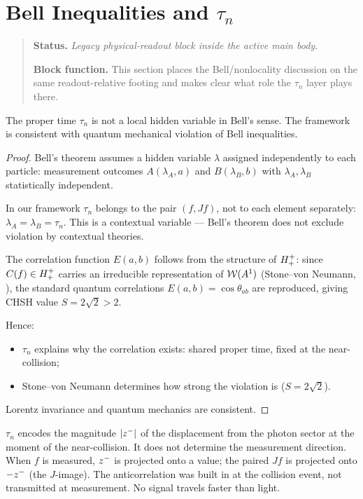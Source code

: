 \section[Bell Inequalities and tau-n]{Bell Inequalities and \texorpdfstring{$\tau_n$}{tau_n}}
\begin{quote}\small
\noindent\textbf{Status.} \emph{Legacy physical-readout block inside the active main body.}\par
\noindent\textbf{Block function.} This section places the Bell/nonlocality discussion on the same readout-relative footing and makes clear what role the $\tau_n$ layer plays there.
\end{quote}
\label{sec:bell}

\begin{theorem}
\label{thm:bell-consistency}
The proper time $\tau_n$ is not a local hidden variable in Bell's sense.
The framework is consistent with quantum mechanical violation of Bell
inequalities.
\begin{proof}
Bell's theorem assumes a hidden variable $\lambda$ assigned independently
to each particle: measurement outcomes $A(\lambda_A,a)$ and
$B(\lambda_B,b)$ with $\lambda_A,\lambda_B$ statistically independent.

In our framework $\tau_n$ belongs to the pair $(f,Jf)$, not to each
element separately: $\lambda_A=\lambda_B=\tau_n$.
This is a contextual variable --- Bell's theorem does not exclude
violation by contextual theories.

The correlation function $E(a,b)$ follows from the structure of
$H^+_+$: since $C(f)\in H^+_+$ carries an irreducible
representation of $\mathcal{W}(A^1)$ (Stone--von Neumann, \cite{brendecke2026rh}),
the standard quantum correlations $E(a,b)=\cos\theta_{ab}$ are
reproduced, giving CHSH value $S=2\sqrt{2}>2$.

Hence:
\begin{itemize}
  \item $\tau_n$ explains why the correlation exists: shared proper time,
        fixed at the near-collision;
  \item Stone--von Neumann determines how strong the violation is
        ($S=2\sqrt{2}$).
\end{itemize}
Lorentz invariance and quantum mechanics are consistent.
\end{proof}
\end{theorem}

\begin{remark}
$\tau_n$ encodes the magnitude $|z^-|$ of the displacement from the
photon sector at the moment of the near-collision.
It does not determine the measurement direction.
When $f$ is measured, $z^-$ is projected onto a value; the paired
$Jf$ is projected onto $-z^-$ (the $J$-image).
The anticorrelation was built in at the collision event, not transmitted
at measurement. No signal travels faster than light.
\end{remark}


